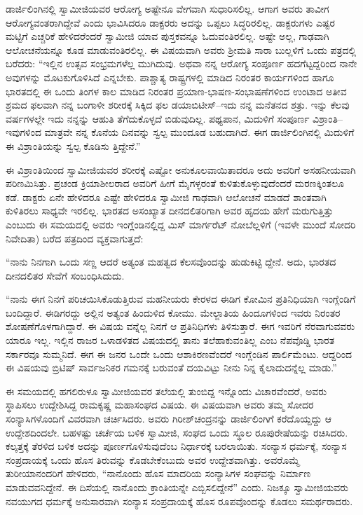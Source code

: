 ಡಾರ್ಜಿಲಿಂಗಿನಲ್ಲಿ ಸ್ವಾಮೀಜಿಯವರ ಆರೋಗ್ಯ ಅಷ್ಟೇನೂ ವೇಗವಾಗಿ ಸುಧಾರಿಸಲಿಲ್ಲ. ಆಗಾಗ ಅವರು ತಾವೀಗ ಆರೋಗ್ಯವಂತರಾಗಿದ್ದೇವೆ ಎಂದು ಭಾವಿಸಿದರೂ ಡಾಕ್ಟರರು ಅದನ್ನು ಒಪ್ಪಲು ಸಿದ್ಧರಿರಲಿಲ್ಲ. ಡಾಕ್ಟರುಗಳು ಎಷ್ಟರ ಮಟ್ಟಿಗೆ ಎಚ್ಚರಿಕೆ ಹೇಳಿದರೆಂದರೆ ಸ್ವಾಮೀಜಿ ಯಾವ ಪುಸ್ತಕವನ್ನೂ ಓದುವಂತಿರಲಿಲ್ಲ. ಅಷ್ಟೇ ಅಲ್ಲ, ಗಾಢವಾಗಿ ಆಲೋಚನೆಯನ್ನೂ ಕೂಡ ಮಾಡುವಂತಿರಲಿಲ್ಲ. ಈ ವಿಷಯವಾಗಿ ಅವರು ಶ್ರೀಮತಿ ಸಾರಾ ಬುಲ್ಲಳಿಗೆ ಒಂದು ಪತ್ರದಲ್ಲಿ ಬರೆದರು: “ಇಲ್ಲಿನ ಉತ್ಸವ ಸಂಭ್ರಮಗಳೆಲ್ಲ ಮುಗಿದುವು. ಅಥವಾ ನನ್ನ ಆರೋಗ್ಯ ಸಂಪೂರ್ಣ ಹದಗೆಟ್ಟದ್ದರಿಂದ ನಾನೇ ಅವುಗಳನ್ನು ಮೊಟಕುಗೊಳಿಸಿದೆ ಎನ್ನಬೇಕು. ಪಾಶ್ಚಾತ್ಯ ರಾಷ್ಟ್ರಗಳಲ್ಲಿ ಮಾಡಿದ ನಿರಂತರ ಕಾರ್ಯಗಳಿಂದ ಹಾಗೂ ಭಾರತದಲ್ಲಿ ಈ ಒಂದು ತಿಂಗಳ ಕಾಲ ಮಾಡಿದ ನಿರಂತರ ಪ್ರಯಾಣ-ಭಾಷಣ-ಸಂಭಾಷಣೆಗಳಿಂದ ಉಂಟಾದ ಅತೀವ ಶ್ರಮದ ಫಲವಾಗಿ ನನ್ನ ಬಂಗಾಳೀ ಶರೀರಕ್ಕೆ ಸಿಕ್ಕಿದ ಫಲ ಡಯಾಬಿಟೀಸ್​–ಇದು ನನ್ನ ಮನೆತನದ ಶತ್ರು. ಇನ್ನು ಕೆಲವು ವರ್ಷಗಳಲ್ಲೇ ಇದು ನನ್ನನ್ನು ಆಹುತಿ ತೆಗೆದುಕೊಳ್ಳದೆ ಬಿಡುವುದಿಲ್ಲ. ಪಥ್ಯಪಾನ, ಮಿದುಳಿಗೆ ಸಂಪೂರ್ಣ ವಿಶ್ರಾಂತಿ–ಇವುಗಳಿಂದ ಮಾತ್ರವೇ ನನ್ನ ಕೊನೆಯ ದಿನವನ್ನು ಸ್ವಲ್ಪ ಮುಂದೂಡ ಬಹುದಾಗಿದೆ. ಈಗ ಡಾರ್ಜಿಲಿಂಗಿನಲ್ಲಿ ಮಿದುಳಿಗೆ ಈ ವಿಶ್ರಾಂತಿಯನ್ನು ಸ್ವಲ್ಪ ಕೊಡಿಸು ತ್ತಿದ್ದೇನೆ.”

ಈ ವಿಶ್ರಾಂತಿಯಿಂದ ಸ್ವಾಮೀಜಿಯವರ ಶರೀರಕ್ಕೆ ಎಷ್ಟೋ ಅನುಕೂಲವಾಯಿತಾದರೂ ಅದು ಅವರಿಗೆ ಅಸಹನೀಯವಾಗಿ ಪರಿಣಮಿಸಿತ್ತು. ಪ್ರಚಂಡ ಕ್ರಿಯಾಶೀಲರಾದ ಅವರಿಗೆ ಹೀಗೆ ಮೈಗಳ್ಳರಂತೆ ಕುಳಿತುಕೊಳ್ಳುವುದೆಂದರೆ ಮರಣಕ್ಕಿಂತಲೂ ಕಡೆ. ಡಾಕ್ಟರು ಏನೇ ಹೇಳಿದರೂ ಎಷ್ಟೇ ಹೇಳಿದರೂ ಸ್ವಾಮೀಜಿ ಗಾಢವಾಗಿ ಆಲೋಚನೆ ಮಾಡದೆ ಶಾಂತವಾಗಿ ಕುಳಿತಿರಲು ಸಾಧ್ಯವೇ ಇರಲಿಲ್ಲ. ಭಾರತದ ಅಸಂಖ್ಯಾತ ದೀನದಲಿತರಿಗಾಗಿ ಅವರ ಹೃದಯ ಹೇಗೆ ಮರುಗುತ್ತಿತ್ತು ಎಂಬುದು ಈ ಸಮಯದಲ್ಲಿ ಅವರು ಇಂಗ್ಲೆಂಡಿನಲ್ಲಿದ್ದ ಮಿಸ್ ಮಾರ್ಗರೆಟ್ ನೋಬೆಲ್ಲಳಿಗೆ (ಇವಳೇ ಮುಂದೆ ಸೋದರಿ ನಿವೇದಿತಾ) ಬರೆದ ಪತ್ರದಿಂದ ವ್ಯಕ್ತವಾಗುತ್ತದೆ:

“ನಾನು ನಿನಗಾಗಿ ಒಂದು ಸಣ್ಣ ಆದರೆ ಅತ್ಯಂತ ಮಹತ್ವದ ಕೆಲಸವೊಂದನ್ನು ಹುಡುಕಿಟ್ಟಿ ದ್ದೇನೆ. ಅದು, ಭಾರತದ ದೀನದಲಿತರ ಸೇವೆಗೆ ಸಂಬಂಧಿಸಿದುದು.

“ನಾನು ಈಗ ನಿನಗೆ ಪರಿಚಯಿಸಿಕೊಡುತ್ತಿರುವ ಮಹನೀಯರು ಕೇರಳದ ಈಡಿಗ ಕೋಮಿನ ಪ್ರತಿನಿಧಿಯಾಗಿ ಇಂಗ್ಲೆಂಡಿಗೆ ಬಂದಿದ್ದಾರೆ. ಈಡಿಗರದ್ದು ಅಲ್ಲಿನ ಅತ್ಯಂತ ಹಿಂದುಳಿದ ಕೋಮು. ಮೇಲ್ಜಾತಿಯ ಹಿಂದೂಗಳಿಂದ ಇವರು ನಿರಂತರ ಶೋಷಣೆಗೊಳಗಾಗಿದ್ದಾರೆ. ಈ ವಿಷಯ ವನ್ನೆಲ್ಲ ನಿನಗೆ ಆ ಪ್ರತಿನಿಧಿಗಳು ತಿಳಿಸುತ್ತಾರೆ. ಈಗ ಇವರಿಗೆ ನೆರವಾಗುವವರು ಯಾರೂ ಇಲ್ಲ. ಇಲ್ಲಿನ ರಾಜರ ಒಳಾಡಳಿತದ ವಿಷಯದಲ್ಲಿ ತಾನು ತಲೆಹಾಕುವಂತಿಲ್ಲ ಎಂಬ ನೆಪವೊಡ್ಡಿ ಭಾರತ ಸರ್ಕಾರವೂ ಸುಮ್ಮನಿದೆ. ಈಗ ಈ ಜನರ ಒಂದೇ ಒಂದು ಆಶಾಕಿರಣವೆಂದರೆ ಇಂಗ್ಲೆಂಡಿನ ಪಾರ್ಲಿಮೆಂಟು. ಆದ್ದರಿಂದ ಈ ವಿಷಯವು ಬ್ರಿಟಿಷ್ ಸಾರ್ವಜನಿಕರ ಗಮನಕ್ಕೆ ಬರುವಂತೆ ದಯವಿಟ್ಟು ನೀನು ನಿನ್ನ ಕೈಲಾದುದನ್ನೆಲ್ಲ ಮಾಡು.”

ಈ ಸಮಯದಲ್ಲಿ ಹಗಲಿರುಳೂ ಸ್ವಾಮೀಜಿಯವರ ತಲೆಯಲ್ಲಿ ತುಂಬಿದ್ದ ಇನ್ನೊಂದು ವಿಚಾರವೆಂದರೆ, ಅವರು ಸ್ಥಾಪಿಸಲು ಉದ್ದೇಶಿಸಿದ್ದ ರಾಮಕೃಷ್ಣ ಮಹಾಸಂಘದ ವಿಷಯ. ಈ ವಿಷಯವಾಗಿ ಅವರು ತಮ್ಮ ಸೋದರ ಸಂನ್ಯಾಸಿಗಳೊಂದಿಗೆ ವಿವರವಾಗಿ ಚರ್ಚಿಸಿದರು. ಅವರು ಗಿರೀಶ್​ಚಂದ್ರನನ್ನು ಡಾರ್ಜಿಲಿಂಗಿಗೆ ಕರೆದೊಯ್ದದ್ದು ಆ ಉದ್ದೇಶದಿಂದಲೇ. ಬಹಳಷ್ಟು ಚರ್ಚೆಯ ಬಳಿಕ ಸ್ವಾಮೀಜಿ, ಸಂಘದ ಒಂದು ಸ್ಥೂಲ ರೂಪುರೇಷೆಯನ್ನು ರಚಿಸಿದರು. ಕಲ್ಕತ್ತಕ್ಕೆ ತೆರಳಿದ ಬಳಿಕ ಅದನ್ನು ಪೂರ್ಣಗೊಳಿಸುವುದೆಂಬ ನಿರ್ಧಾರಕ್ಕೆ ಬರಲಾಯಿತು. ಸಂನ್ಯಾಸ ಧರ್ಮಕ್ಕೆ, ಸಂನ್ಯಾಸ ಸಂಪ್ರದಾಯಕ್ಕೆ ಒಂದು ಹೊಸ ತಿರುವನ್ನು ಕೊಡಬೇಕೆಂಬುದು ಅವರ ಉದ್ದೇಶವಾಗಿತ್ತು. ಅವರೊಮ್ಮೆ ತುರೀಯಾನಂದರಿಗೆ ಹೇಳಿದರು, “ನಾನೊಂದು ಹೊಸ ಮಾದರಿಯ ಸಂನ್ಯಾಸಿಗಳ ಸಂಘವನ್ನು ನಿರ್ಮಾಣ ಮಾಡುವವನಿದ್ದೇನೆ. ಈ ದಿಸೆಯಲ್ಲಿ ನಾನೊಂದು ಕ್ರಾಂತಿಯನ್ನೇ ಎಬ್ಬಿಸಲಿದ್ದೇನೆ” ಎಂದು. ನಿಜಕ್ಕೂ ಸ್ವಾಮೀಜಿಯವರು ನವಯುಗದ ಧರ್ಮಕ್ಕೆ ಅನುಸಾರವಾಗಿ ಸಂನ್ಯಾಸ ಸಂಪ್ರದಾಯಕ್ಕೆ ಹೊಸ ರೂಪವೊಂದನ್ನು ಕೊಡಲು ಸಮರ್ಥರಾದರು.

